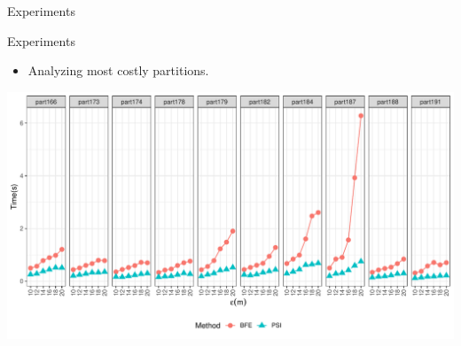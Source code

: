\documentclass{beamer}
\begin{document}
\begin{frame}{Experiments}
\begin{figure}
\begin{subfigure}[t]{0.32\textwidth}
            \end{subfigure}
        \end{figure}
    \end{frame}

    \begin{frame}{Experiments}
        \begin{itemize} \item Analyzing most costly partitions. \end{itemize} \vspace{0.5cm}
        \includegraphics[width=\textwidth]
                {../thesis/chapter4/figures/plots/03_top_time_partitions/top_time_partitions}

    \end{frame}
\end{document}
